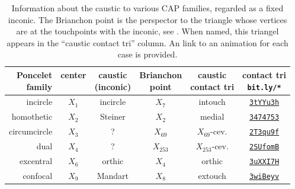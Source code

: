 \begin{table}
\centering
\begin{tabular}{|r|c|c|c|c|c|}
\hline
\makecell[rc]{Poncelet\\family} &
center &
\makecell[cc]{caustic\\(inconic)} & 
\makecell[cc]{Brianchon\\point} &
\makecell[cc]{caustic\\contact tri} &
\makecell[cc]{contact tri\\ \texttt{bit.ly/*}} \\
\hline
incircle & $X_1$ &  incircle & $X_7$ & intouch & \href{https://bit.ly/3tYYu3h}{\texttt{3tYYu3h}}\\
homothetic & $X_2$ & Steiner & $X_2$ & medial & \href{https://bit.ly/3474753}{\texttt{3474753}} \\
circumcircle & $X_3$ & ? & $X_{69}$ & $X_{69}$-cev. & \href{https://bit.ly/2T3qu9f}{\texttt{2T3qu9f}}\\
dual & $X_4$ & ? & $X_{253}$ & $X_{253}$-cev. & \href{https://bit.ly/2SUfomB}{\texttt{2SUfomB}} \\
excentral & $X_6$ & orthic & $X_4$ & orthic & \href{https://bit.ly/3uXXI7H}{\texttt{3uXXI7H}}\\
confocal & $X_9$ & Mandart & $X_8$ & extouch & \href{https://bit.ly/3wiBeyv}{\texttt{3wiBeyv}} \\
\hline
\end{tabular}
\caption{Information about the caustic to various CAP families, regarded as a fixed inconic. The Brianchon point is the perspector to the triangle whose vertices are at the touchpoints with the inconic, see \cite[Brianchon point]{mw}. When named, this triangel appears in the ``caustic contact tri'' column. An link to an animation for each case is provided.}
\label{tab:03-inconics}
\end{table}
